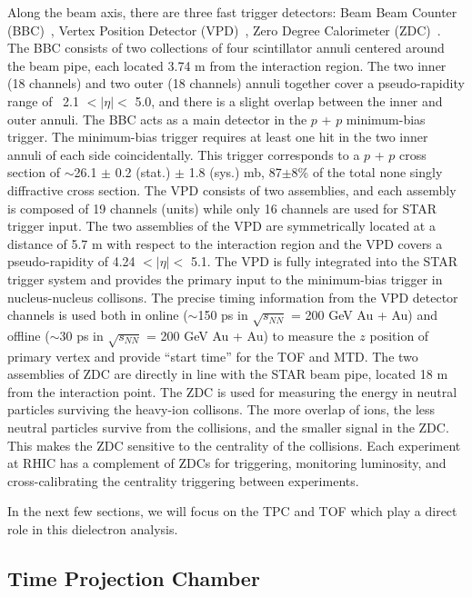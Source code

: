 Along the beam axis, there are three fast trigger detectors: Beam Beam Counter (BBC)~\cite{BBCdet}, Vertex Position Detector (VPD)~\cite{VPDdet}, Zero Degree Calorimeter (ZDC)~\cite{ZDCdet}.  The BBC consists of two collections of four scintillator annuli centered around the beam pipe, each located 3.74 m from the interaction region. The two inner (18 channels) and two outer (18 channels) annuli together cover a pseudo-rapidity range of ~2.1 $<|\eta|<$ 5.0, and there is a slight overlap between the inner and outer annuli. The BBC acts as a main detector in the $p$ + $p$ minimum-bias trigger. The minimum-bias trigger requires at least one hit in the two inner annuli of each side coincidentally. This trigger corresponds to a $p$ + $p$ cross section of  $\sim$26.1 $\pm$ 0.2 (stat.) $\pm$ 1.8 (sys.) mb, 87$\pm$8\% of the total none singly diffractive cross section. The VPD consists of two assemblies, and each assembly is composed of 19 channels (units) while only 16 channels are used for STAR trigger input. The two assemblies of the VPD are symmetrically located at a distance of 5.7 m with respect to the interaction region and the VPD covers a pseudo-rapidity of 4.24 $<|\eta|<$ 5.1. The VPD is fully integrated into the STAR trigger system and provides the primary input to the minimum-bias trigger in nucleus-nucleus collisons. The precise timing information from the VPD detector channels is used both in online ($\sim$150 ps in $\sqrt{s_{NN}}$ = 200 GeV Au + Au) and offline ($\sim$30 ps in $\sqrt{s_{NN}}$ = 200 GeV Au + Au) to measure the $z$ position of primary vertex and provide ``start time'' for the TOF and MTD. The two assemblies of ZDC are directly in line with the STAR beam pipe, located 18 m from the interaction point. The ZDC is used for measuring the energy in neutral particles surviving the heavy-ion collisons. The more overlap of ions, the less neutral particles survive from the collisions, and the smaller signal in the ZDC. This makes the ZDC sensitive to the centrality of the collisions. Each experiment at RHIC has a complement of ZDCs for triggering, monitoring luminosity, and cross-calibrating the centrality triggering between experiments.

In the next few sections, we will focus on the TPC and TOF which play a direct role in this dielectron analysis.

\subsection{Time Projection Chamber}
\label{detector:TPC}


